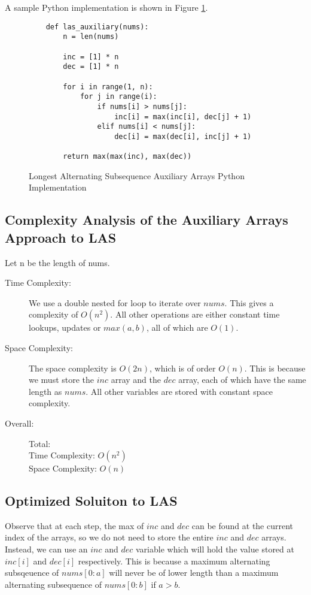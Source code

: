 A sample Python implementation is shown in Figure \ref{fig:las-auxiliary}.

\begin{figure}[H]
    \centering
    \begin{lstlisting}
    def las_auxiliary(nums):
        n = len(nums)
        
        inc = [1] * n
        dec = [1] * n
    
        for i in range(1, n):
            for j in range(i):
                if nums[i] > nums[j]:
                    inc[i] = max(inc[i], dec[j] + 1)
                elif nums[i] < nums[j]:
                    dec[i] = max(dec[i], inc[j] + 1)

        return max(max(inc), max(dec))
    \end{lstlisting}
    \caption{Longest Alternating Subsequence Auxiliary Arrays Python Implementation}
    \label{fig:las-auxiliary}
\end{figure}
\newpage

\subsection{Complexity Analysis of the Auxiliary Arrays Approach to LAS}
Let n be the length of nums.
\begin{description}
    \item[Time Complexity:]
        We use a double nested for loop to iterate over $nums$.
        This gives a complexity of $O(n^2)$.
        All other operations are either constant time lookups, updates or $max(a,b)$,
        all of which are $O(1)$.
        
    \item[Space Complexity:] 
        The space complexity is $O(2n)$, which is of order $O(n)$.
        This is because we must store the $inc$ array and the $dec$ array,
        each of which have the same length as $nums$.
        All other variables are stored with constant space complexity.

        
    \item[Overall:] Total:\\
        Time Complexity: $O(n^2)$\\
        Space Complexity: $O(n)$
    
\end{description}


\subsection{Optimized Soluiton to LAS}
Observe that at each step, the max of $inc$ and $dec$ can be found at the current index of the arrays,
so we do not need to store the entire $inc$ and $dec$ arrays.
Instead, we can use an $inc$ and $dec$ variable which will hold the value stored at $inc[i]$ and $dec[i]$ respectively.
This is because a maximum alternating subsqeuence of $nums[0:a]$ will never be of lower length than a maximum alternating subsequence of $nums[0:b]$ if $a > b$.

